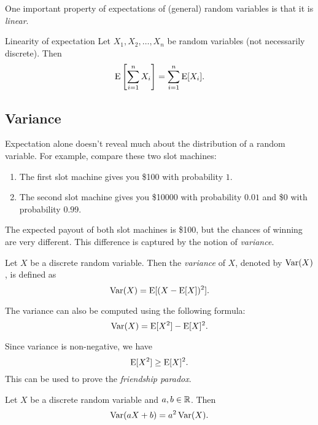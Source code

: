 \documentclass{article}
\begin{document}
One important property of expectations of (general) random variables is that it is \emph{linear}.

\begin{theorem}{Linearity of expectation}
  Let $X_1, X_2, \ldots, X_n$ be random variables (not necessarily discrete).
  Then
  \[
    \operatorname{E}\left[\sum\limits_{i = 1}^n X_i\right] = \sum\limits_{i = 1}^n \operatorname{E}[X_i].
  \]
\end{theorem}

\subsection{Variance}

Expectation alone doesn't reveal much about the distribution of a random variable.
For example, compare these two slot machines:
\begin{enumerate}
  \item The first slot machine gives you \$100 with probability $1$.
  \item The second slot machine gives you \$10000 with probability $0.01$ and \$0 with probability $0.99$.
\end{enumerate}
The expected payout of both slot machines is \$100, but the chances of winning are very different.
This difference is captured by the notion of \emph{variance}.

\begin{definition}
  Let $X$ be a discrete random variable.
  Then the \emph{variance} of $X$, denoted by $\operatorname{Var}(X)$, is defined as
  \[
    \operatorname{Var}(X) = \operatorname{E}[(X - \operatorname{E}[X])^2].
  \]
\end{definition}

\begin{remark}
  The variance can also be computed using the following formula:
  \[
    \operatorname{Var}(X) = \operatorname{E}[X^2] - \operatorname{E}[X]^2.
  \]
\end{remark}

\begin{remark}
  Since variance is non-negative, we have
  \[
    \operatorname{E}[X^2] \geq \operatorname{E}[X]^2.
  \]
  This can be used to prove the \emph{friendship paradox}.
\end{remark}

\begin{proposition}
  Let $X$ be a discrete random variable and $a, b \in \mathbb{R}$.
  Then
  \[
    \operatorname{Var}(a X + b) = a^2 \operatorname{Var}(X).
  \]
\end{proposition}
\end{document}
